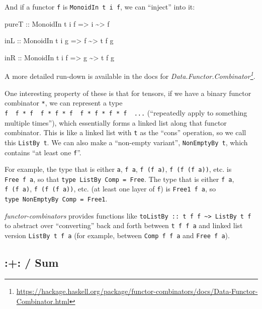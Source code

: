 \documentclass[]{article}
\newenvironment{Shaded}{}{}
\newcommand{\DataTypeTok}[1]{\textcolor[rgb]{0.56,0.13,0.00}{#1}}
\newcommand{\NormalTok}[1]{#1}
\newcommand{\OperatorTok}[1]{\textcolor[rgb]{0.40,0.40,0.40}{#1}}
\newcommand{\OtherTok}[1]{\textcolor[rgb]{0.00,0.44,0.13}{#1}}
\renewcommand{\href}[2]{#2\footnote{\url{#1}}}
\begin{document}
And if a functor \texttt{f} is \texttt{MonoidIn\ t\ i\ f}, we can ``inject''
into it:

\begin{Shaded}
\begin{Highlighting}[]
\NormalTok{pureT}
\OtherTok{    ::} \DataTypeTok{MonoidIn}\NormalTok{ t i f}
    \OtherTok{=>}\NormalTok{ i }\OperatorTok{\textasciitilde{}>}\NormalTok{ f}

\OtherTok{inL ::} \DataTypeTok{MonoidIn}\NormalTok{ t i g}
    \OtherTok{=>}\NormalTok{ f }\OperatorTok{\textasciitilde{}>}\NormalTok{ t f g}

\OtherTok{inR ::} \DataTypeTok{MonoidIn}\NormalTok{ t i f}
    \OtherTok{=>}\NormalTok{ g }\OperatorTok{\textasciitilde{}>}\NormalTok{ t f g}
\end{Highlighting}
\end{Shaded}

A more detailed run-down is available in the docs for
\emph{\href{https://hackage.haskell.org/package/functor-combinators/docs/Data-Functor-Combinator.html}{Data.Functor.Combinator}}.

One interesting property of these is that for tensors, if we have a binary
functor combinator \texttt{*}, we can represent a type
\texttt{f\ \textbar{}\ f\ *\ f\ \textbar{}\ f\ *\ f\ *\ f\ \textbar{}\ f\ *\ f\ *\ f\ *\ f\ \textbar{}\ ...}
(``repeatedly apply to something multiple times''), which essentially forms a
linked list along that functor combinator. This is like a linked list with
\texttt{t} as the ``cons'' operation, so we call this \texttt{ListBy\ t}. We can
also make a ``non-empty variant'', \texttt{NonEmptyBy\ t}, which contains ``at
least one \texttt{f}''.

For example, the type that is either \texttt{a}, \texttt{f\ a},
\texttt{f\ (f\ a)}, \texttt{f\ (f\ (f\ a))}, etc. is \texttt{Free\ f\ a}, so
that \texttt{type\ ListBy\ Comp\ =\ Free}. The type that is either
\texttt{f\ a}, \texttt{f\ (f\ a)}, \texttt{f\ (f\ (f\ a))}, etc. (at least one
layer of \texttt{f}) is \texttt{Free1\ f\ a}, so
\texttt{type\ NonEmptyBy\ Comp\ =\ Free1}.

\emph{functor-combinators} provides functions like
\texttt{toListBy\ ::\ t\ f\ f\ \textasciitilde{}\textgreater{}\ ListBy\ t\ f} to
abstract over ``converting'' back and forth between \texttt{t\ f\ f\ a} and
linked list version \texttt{ListBy\ t\ f\ a} (for example, between
\texttt{Comp\ f\ f\ a} and \texttt{Free\ f\ a}).

\hypertarget{sum}{%
\subsection{:+: / Sum}\label{sum}}
\end{document}
